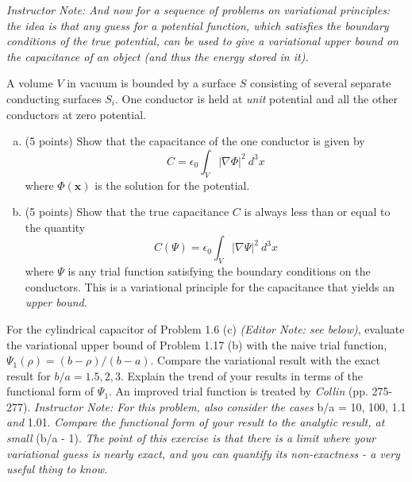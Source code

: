 \documentclass[11pt]{cubouldpset}
\begin{document}
\begin{solution}
\vfill
\end{solution}

\newpage

\textit{Instructor Note: And now for a sequence of problems on variational principles: the idea is that any guess for a potential function, which satisfies the boundary conditions of the true potential, can be used to give a variational upper bound on the capacitance of an object (and thus the energy stored in it).}
\newline
\newline
\begin{problem}[1.17 (10 points)] 

A volume $V$ in vacuum is bounded by a surface $S$ consisting of several separate conducting surfaces $S_i$. One conductor is held at \textit{unit} potential and all the other conductors at zero potential.
\begin{enumerate}[(a)]

\item (5 points) Show that the capacitance of the one conductor is given by
$$ C = \epsilon_0 \int_V |\nabla \Phi| ^2\ d^3x $$
where $\Phi(\mathbf{x})$ is the solution for the potential.

\item (5 points) Show that the true capacitance $C$ is always less than or equal to the quantity
$$ C(\Psi) = \epsilon_0 \int_V |\nabla \Psi |^2\ d^3x $$
where $\Psi$ is any trial function satisfying the boundary conditions on the conductors. This is a variational principle for the capacitance that yields an \textit{upper bound}.

\end{enumerate}
\end{problem}

\begin{solution}
\vfill
\end{solution}

\newpage

\begin{problem}[1.19 (10 points)] 

For the cylindrical capacitor of Problem 1.6 (c) \textit{(Editor Note: see below)}, evaluate the variational upper bound of Problem 1.17 (b) with the naive trial function, $\Psi_1(\rho) = (b-\rho)/(b-a)$. Compare the variational result with the exact result for $b/a = 1.5, 2, 3$. Explain the trend of your results in terms of the functional form of $\Psi_1$. An improved trial function is treated by \textit{Collin} (pp. 275-277).
\newline
\newline
\textit{Instructor Note: For this problem, also consider the cases} b/a = 10, 100, 1.1 \textit{and} 1.01. \textit{Compare the functional form of your result to the analytic result, at small} (b/a - 1). \textit{The point of this exercise is that there is a limit where your variational guess is nearly exact, and you can quantify its non-exactness - a very useful thing to know.}

\end{problem}
\end{document}
